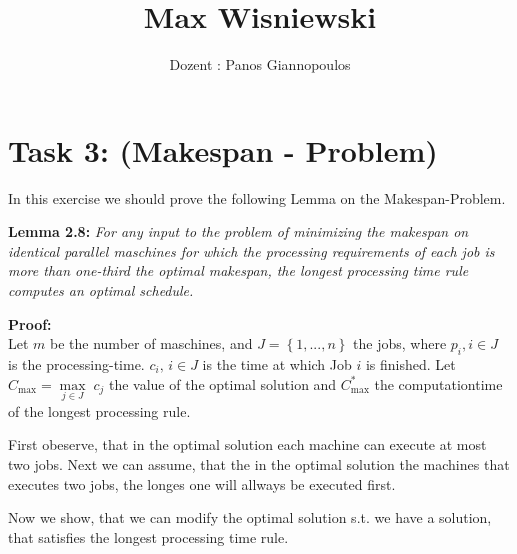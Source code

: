 \documentclass[11pt,a4paper,ngerman]{article}
\date{}
\title{Max Wisniewski}
\author{Dozent : Panos Giannopoulos}
\begin{document}

\renewcommand{\figurename}{Figure}

\maketitle
\thispagestyle{fancy}


\section*{Task 3: \mdseries (Makespan - Problem)}

In this exercise we should prove the following Lemma on the Makespan-Problem.

\begin{description}
    \item{\bfseries Lemma 2.8:} 
        {\rmfamily\itshape
            For any input to the problem of minimizing the makespan on
            identical parallel maschines for which the processing
            requirements of each job is more than one-third the 
            optimal makespan, the longest processing time rule
            computes an optimal schedule.
        }
    \item{\bfseries Proof:}\\
        Let $m$ be the number of maschines, and 
        $J = \left\{ 1,... ,n\right\}$ the jobs, where $p_i, i \in J$
        is the processing-time. $c_i, \, i \in J$ is the time at which
        Job $i$ is finished.
        Let $C_{\max} = \underset{j\in J}{\max} \; c_j$ the value of the
        optimal solution and $C_{\max}^*$ the computationtime of the longest
        processing rule. 

        First obeserve, that in the optimal solution each machine can
        execute at most two jobs. Next we can assume, that the in the
        optimal solution the machines that executes two jobs, the
        longes one will allways be executed first.

        Now we show, that we can modify the optimal solution
        s.t. we have a solution, that satisfies the longest processing
        time rule. 
\end{description}

\label{LastPage}
\end{document}
